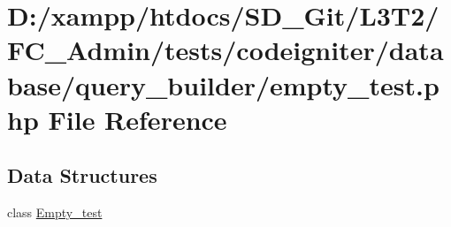 \hypertarget{_admin_2tests_2codeigniter_2database_2query__builder_2empty__test_8php}{}\section{D\+:/xampp/htdocs/\+S\+D\+\_\+\+Git/\+L3\+T2/\+F\+C\+\_\+\+Admin/tests/codeigniter/database/query\+\_\+builder/empty\+\_\+test.php File Reference}
\label{_admin_2tests_2codeigniter_2database_2query__builder_2empty__test_8php}
\subsection*{Data Structures}
\begin{DoxyCompactItemize}
\item 
class \hyperlink{class_empty__test}{Empty\+\_\+test}
\end{DoxyCompactItemize}
